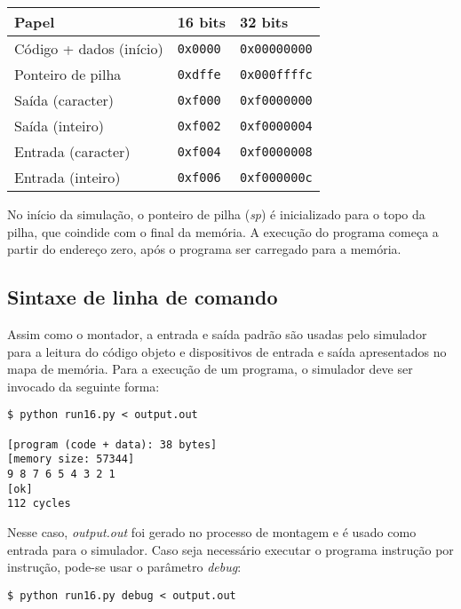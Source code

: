 \documentclass{extreport}
\begin{document}
\begin{table}[ht!]
\centering
\begin{tabular}{|p{5.0cm}|p{3.0cm}|p{3.0cm}|}
\hline
\bf{Papel} 		& \bf{16 bits} 		& \bf{32 bits}		\\ \hline \hline
Código + dados (início)	& \texttt{0x0000}	& \texttt{0x00000000}	\\ \hline
Ponteiro de pilha	& \texttt{0xdffe}	& \texttt{0x000ffffc}	\\ \hline
Saída (caracter)	& \texttt{0xf000}	& \texttt{0xf0000000}	\\ \hline
Saída (inteiro)		& \texttt{0xf002}	& \texttt{0xf0000004}	\\ \hline
Entrada (caracter)	& \texttt{0xf004}	& \texttt{0xf0000008}	\\ \hline
Entrada (inteiro)	& \texttt{0xf006}	& \texttt{0xf000000c}	\\ \hline
\end{tabular}
\end{table}

No início da simulação, o ponteiro de pilha (\textit{sp}) é inicializado para o topo da pilha, que coindide com o final da memória. A execução do programa começa a partir do endereço zero, após o programa ser carregado para a memória.

\subsection{Sintaxe de linha de comando}

Assim como o montador, a entrada e saída padrão são usadas pelo simulador para a leitura do código objeto e dispositivos de entrada e saída apresentados no mapa de memória. Para a execução de um programa, o simulador deve ser invocado da seguinte forma:

\begin{verbatim}
$ python run16.py < output.out

[program (code + data): 38 bytes]
[memory size: 57344]
9 8 7 6 5 4 3 2 1
[ok]
112 cycles
\end{verbatim}

Nesse caso, \textit{output.out} foi gerado no processo de montagem e é usado como entrada para o simulador. Caso seja necessário executar o programa instrução por instrução, pode-se usar o parâmetro \textit{debug}:

\begin{verbatim}
$ python run16.py debug < output.out
\end{verbatim}
\end{document}
